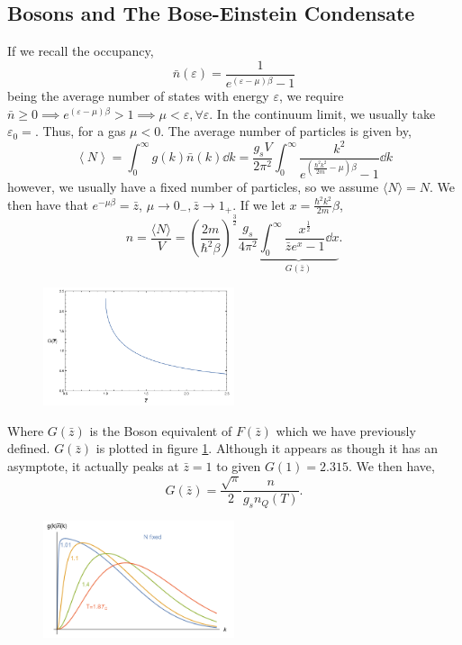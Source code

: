\documentclass{book}
\begin{document}
\subsection{Bosons and The Bose-Einstein Condensate}
If we recall the occupancy,
\begin{equation}
	\bar{n}(\varepsilon) = \frac{1}{e^{(\varepsilon - \mu)\beta} -1}
\end{equation}
being the average number of states with energy $\varepsilon$, we require $\bar{n} \geq 0 \implies e^{(\varepsilon - \mu)\beta} > 1 \implies \mu < \varepsilon, \forall \varepsilon$. In the continuum limit, we usually take $\varepsilon_0 = $. Thus, for a gas $\mu < 0$. The average number of particles is given by,
\begin{equation}
	\left<N\right> = \int_0^{\infty}g(k)\bar{n}(k) \dd{k} = \frac{g_sV}{2\pi^2}\int_0^{\infty}\frac{k^2}{e^{\left(\frac{\hbar^2k^2}{2m} - \mu\right)\beta} - 1}\dd{k}
\end{equation}
however, we usually have a fixed number of particles, so we assume $\langle N \rangle = N$. We then have that $e^{-\mu\beta} = \bar{z}$, $\mu \to 0_-, \bar{z} \to 1_+$. If we let $x = \frac{\hbar^2k^2}{2m}\beta$,
\begin{equation}
	n = \frac{\langle N \rangle}{V} = \left(\frac{2m}{\hbar^2\beta}\right)^{\frac{3}{2}}\frac{g_s}{4\pi^2}\underbrace{\int_0^{\infty}\frac{x^{\frac{1}{2}}}{\bar{z}e^{x} - 1}\dd{x}}_{G(\bar{z})}.
\end{equation}
\begin{figure}
	\centering
	\includegraphics[width=0.5\textwidth]{G(z).png}
	\caption{} 
	\label{fig:G}
\end{figure}
Where $G(\bar{z})$ is the Boson equivalent of $F(\bar{z})$ which we have previously defined. $G(\bar{z})$ is plotted in figure \ref{fig:G}. Although it appears as though it has an asymptote, it actually peaks at $\bar{z} = 1$ to given $G(1) = 2.315$. We then have,
\begin{equation}
	G(\bar{z}) = \frac{\sqrt{\pi}}{2}\frac{n}{g_sn_Q(T)}.
\end{equation}
\begin{figure}
	\centering
	\includegraphics[width=0.5\textwidth]{Tfix.png}
	\caption{}
	\label{fig:Tfix}
\end{figure}
\end{document}
